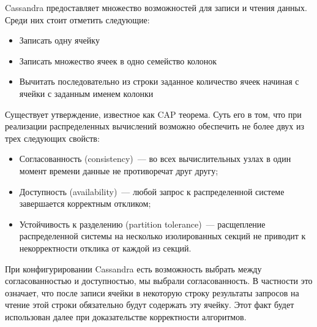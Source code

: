 Cassandra предоставляет множество возможностей для записи и чтения данных. Среди них стоит отметить следующие:

\begin{itemize}
	\item Записать одну ячейку
	\item Записать множество ячеек в одно семейство колонок
	\item Вычитать последовательно из строки заданное количество ячеек начиная с ячейки с заданным именем колонки
\end{itemize}

Существует утверждение, известное как CAP теорема. Суть его в том, что при реализации распределенных вычислений возможно обеспечить не более двух из трех следующих свойств:

\begin{itemize}
	\item Согласованность (consistency)~--- во всех вычислительных узлах в один момент времени данные не противоречат друг другу;
	\item Доступность (availability)~--- любой запрос к распределенной системе завершается корректным откликом;
	\item Устойчивость к разделению (partition tolerance)~--- расщепление распределенной системы на несколько изолированных секций не приводит к некорректности отклика от каждой из секций.
\end{itemize}

При конфигурировании Cassandra есть возможность выбрать между согласованностью и доступностью, мы выбрали согласованность. В частности это означает, что после записи ячейки в некоторую строку результаты запросов на чтение этой строки обязательно будут содержать эту ячейку. Этот факт будет использован далее при доказательстве корректности алгоритмов.